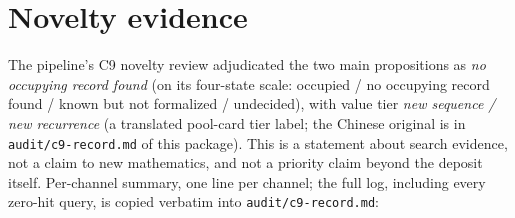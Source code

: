 \documentclass[11pt]{article}
\begin{document}
\section{Novelty evidence}\label{sec:novelty}

The pipeline's C9 novelty review adjudicated the two main propositions as
\emph{no occupying record found} (on its four-state scale: occupied / no
occupying record found / known but not formalized / undecided), with value tier
\emph{new sequence / new recurrence} (a translated pool-card tier label; the
Chinese original is in \texttt{audit/c9-record.md} of this package). This is a
statement about search evidence, not a claim to new mathematics, and not a
priority claim beyond the deposit itself. Per-channel summary, one line per
channel; the full log, including every zero-hit query, is copied verbatim into
\texttt{audit/c9-record.md}:
\end{document}
